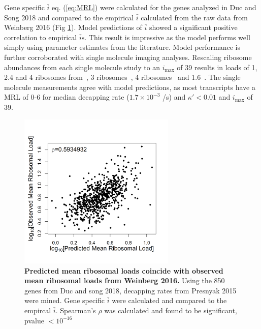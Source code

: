 \documentclass[10pt,letterpaper]{article}
\newcommand{\imax}{\ensuremath{{i_{\max}}}\xspace}
\newcommand{\MRL}{\ensuremath{\bar{i}}\xspace}
\newcommand{\MRLs}{\ensuremath{\bar{i}\text{s}}\xspace}
\begin{document}
Gene specific \MRL eq. (\ref{eq:MRL}) were calculated for the genes analyzed in Duc and Song 2018 and compared to the empirical \MRL calculated from the raw data from Weinberg 2016 (Fig \ref{fig11}).
Model predictions of \MRL showed a significant positive correlation to empirical \MRLs.
This result is impressive as the model performs well simply using parameter estimates from the literature.
Model performance is further corroborated with single molecule imaging analyses.
Rescaling ribosome abundances from each single molecule study to an \imax of 39 results in loads of 1, 2.4 and 4 ribosomes from~\cite{RN30}, 3 ribosomes~\cite{RN31}, 4 ribosomes~\cite{RN32} and 1.6~\cite{RN33}.
The single molecule measurements agree with model predictions, as most transcripts have a MRL of 0-6 for median decapping rate ($1.7\times 10^{-3}$ /s) and  $\kappa' < 0.01$ and \imax of 39.



\begin{figure}[!h]
\begin{center}
\centering
\includegraphics[width=75mm]{Images/Duc_Song_vs_model_log.png}
\caption{{\bf Predicted mean ribosomal loads coincide with observed mean ribosomal loads from Weinberg 2016.}
Using the 850 genes from Duc and song 2018, decapping rates from Presnyak 2015 were mined. Gene specific \MRL were calculated and compared to the empircal \MRL. Spearman's $\rho$ was calculated and found to be significant, pvalue $<10^{-16}$}
\label{fig11}
\end{center}
\end{figure}
\end{document}
